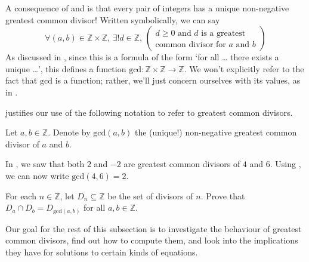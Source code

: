 \begin{aside}
A consequence of  and  is that every pair of integers has a unique non-negative greatest common divisor! Written symbolically, we can say
\[ \forall (a,b) \in \mathbb{Z} \times \mathbb{Z},\, \exists ! d \in \mathbb{Z},\, \begin{pmatrix} d \ge 0 \text{ and } d \text{ is a greatest} \\ \text{common divisor for $a$ and $b$} \end{pmatrix} \]
As discussed in , since this is a formula of the form `for all \dots{} there exists a unique \dots{}', this defines a function $\mathrm{gcd} : \mathbb{Z} \times \mathbb{Z} \to \mathbb{Z}$. We won't explicitly refer to the fact that $\mathrm{gcd}$ is a function; rather, we'll just concern ourselves with its values, as in .
\end{aside}

 justifies our use of the following notation to refer to greatest common divisors.

\begin{notation}
\label{ntnGCDFunction}
Let $a,b \in \mathbb{Z}$. Denote by $\mathrm{gcd}(a,b)$  the (unique!) non-negative greatest common divisor of $a$ and $b$.
\end{notation}

\begin{example}
In , we saw that both $2$ and $-2$ are greatest common divisors of $4$ and $6$. Using , we can now write $\mathrm{gcd}(4,6)=2$.
\end{example}

\begin{exercise}
For each $n \in \mathbb{Z}$, let $D_n \subseteq \mathbb{Z}$ be the set of divisors of $n$. Prove that $D_a \cap D_b = D_{\mathrm{gcd}(a,b)}$ for all $a,b \in \mathbb{Z}$.
\end{exercise}

Our goal for the rest of this subsection is to investigate the behaviour of greatest common divisors, find out how to compute them, and look into the implications they have for solutions to certain kinds of equations.

